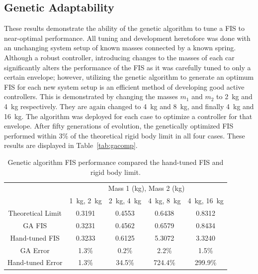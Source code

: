 \documentclass[submit]{aiaa-tc}%
\begin{document}
\subsection{Genetic Adaptability}
These results demonstrate the ability of the genetic algorithm to tune a FIS to near-optimal performance. All tuning and development heretofore was done with an unchanging system setup of known masses connected by a known spring. Although a robust controller\cite{cohen:01jgcd}, introducing changes to the masses of each car significantly alters the performance of the FIS as it was carefully tuned to only a certain envelope; however, utilizing the genetic algorithm to generate an optimum FIS for each new system setup is an efficient method of developing good active controllers. This is demonstrated by changing the masses $m_1$ and $m_2$ to \SI{2}{\kilogram} and \SI{4}{\kilogram} respectively. They are again changed to \SI{4}{\kilogram} and \SI{8}{\kilogram}, and finally \SI{4}{\kilogram} and \SI{16}{\kilogram}. The algorithm was deployed for each case to optimize a controller for that envelope. After fifty generations of evolution, the genetically optimized FIS performed within 3\% of the theoretical rigid body limit in all four cases. These results are displayed in Table~\vref{tab:gacomp}.
\begin{table}
	\centering
	\caption{Genetic algorithm FIS performance compared the hand-tuned FIS and rigid body limit.}
	\label{tab:gacomp}
	\begin{tabular}{|c|c|c|c|c|}
	\cline{2-5}
	\multicolumn{1}{c|}{} & \multicolumn{4}{|c|}{Mass 1 (\si{\kilogram}), Mass 2 (\si{\kilogram})} \\\cline{2-5}
	\multicolumn{1}{c|}{} & \SI{1}{\kilogram}, \SI{2}{\kilogram} & \SI{2}{\kilogram}, \SI{4}{\kilogram} & \SI{4}{\kilogram}, \SI{8}{\kilogram} & \SI{4}{\kilogram}, \SI{16}{\kilogram} \\\hline
	Theoretical Limit & 0.3191 & 0.4553 & 0.6438 & 0.8312 \\\hline
	GA FIS & 0.3231 & 0.4562 & 0.6579 & 0.8434 \\\hline
	Hand-tuned FIS & 0.3233 & 0.6125 & 5.3072 & 3.3240 \\\hline\hline
	GA Error & \multicolumn{1}{|d|}{1.3\%} & \multicolumn{1}{|d|}{0.2\%} & \multicolumn{1}{|d|}{2.2\%} & \multicolumn{1}{|d|}{1.5\%} \\\hline
	Hand-tuned Error & \multicolumn{1}{|d|}{1.3\%} & \multicolumn{1}{|d|}{34.5\%} & \multicolumn{1}{|d|}{724.4\%} & \multicolumn{1}{|d|}{299.9\%} \\\hline
	\end{tabular}
\end{table}
\end{document}
